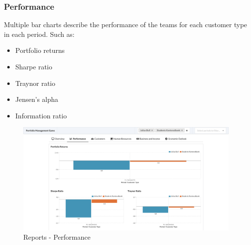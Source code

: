 \subsubsection{Performance}
Multiple bar charts describe the performance of the teams for each customer type in each period. Such as:
\begin{itemize}
  \setlength\itemsep{0.01em}
  \item Portfolio returns
  \item Sharpe ratio
  \item Traynor ratio
  \item Jensen's alpha
  \item Information ratio
\end{itemize}
\begin{figure}[h!]
  \centering
  \includegraphics[scale=0.2]{img/application-overview/reports/02_performance.png}
  \caption{Reports - Performance}
\end{figure}

